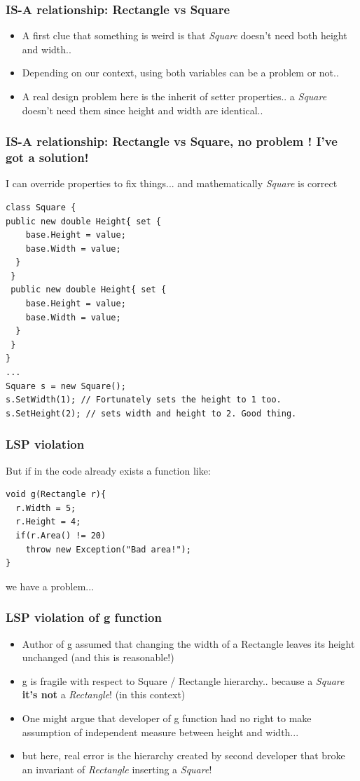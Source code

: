 \documentclass{beamer}
\begin{document}
\begin{frame}
  \frametitle{IS-A relationship: Rectangle vs Square}
  \begin{itemize}
	\item<+-> A first clue that something is weird is that \textit{Square} doesn't need both height and width..
	\item<+-> Depending on our context, using both variables can be a problem or not..
	\item<+-> A real design problem here is the inherit of setter properties.. a \textit{Square} doesn't need them since height and width are identical..
   \end{itemize}
\end{frame}

\begin{frame}[containsverbatim]
	\frametitle{IS-A relationship: Rectangle vs Square, no problem ! I've got a solution!}
	I can override properties to fix things... and mathematically \textit{Square} is correct\\
	\begin{lstlisting}
class Square {
public new double Height{ set {
    base.Height = value;
    base.Width = value;
  }
 }
 public new double Height{ set {
    base.Height = value;
    base.Width = value;
  }
 }
}
...
Square s = new Square();
s.SetWidth(1); // Fortunately sets the height to 1 too.
s.SetHeight(2); // sets width and height to 2. Good thing.

	\end{lstlisting}
\end{frame}

\begin{frame}[containsverbatim]
	\frametitle{LSP violation}
	But if in the code already exists a function like: \\
	\begin{lstlisting}
void g(Rectangle r){
  r.Width = 5;
  r.Height = 4;
  if(r.Area() != 20)
    throw new Exception("Bad area!");
}
	\end{lstlisting}
	we have a problem... \\
\end{frame}

\begin{frame}
  \frametitle{LSP violation of g function}
  \begin{itemize}
	\item<+-> Author of g assumed that changing the width of a Rectangle leaves its height unchanged (and this is reasonable!)
	\item<+-> g is fragile with respect to Square / Rectangle hierarchy.. because a \textit{Square} \textbf{it's not} a \textit{Rectangle}! (in this context)
	\item<+-> One might argue that developer of g function had no right to make assumption of independent measure between height and width...
	\item<+-> but here, real error is the hierarchy created by second developer that broke an invariant of \textit{Rectangle} inserting a \textit{Square}!
   \end{itemize}
\end{frame}
\end{document}
